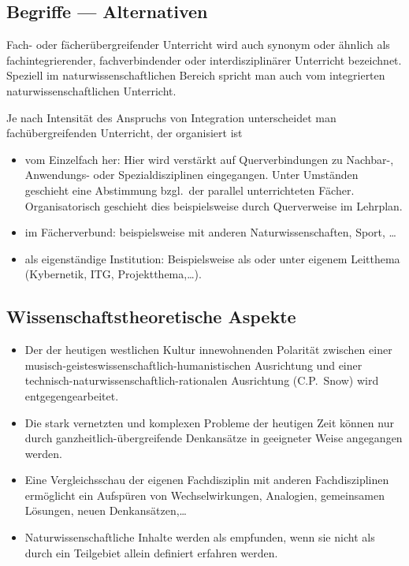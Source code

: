\subsection{Begriffe --- Alternativen}
Fach- oder f\"{a}cher\"{u}bergreifender Unterricht wird auch synonym
oder \"{a}hnlich als fachintegrierender, fachverbindender oder
interdisziplin\"{a}rer Unterricht bezeichnet.
Speziell im naturwissenschaftlichen Bereich spricht man auch vom
integrierten naturwissenschaftlichen Unterricht.

\mip
Je nach Intensit\"{a}t des Anspruchs von Integration unterscheidet man
fach\"{u}bergreifenden Unterricht, der organisiert ist
\begin{itemize}
\setlength{\itemsep}{0mm}
\item
vom Einzelfach her:
Hier wird verst\"{a}rkt auf Querverbindungen zu Nachbar-,
Anwendungs- oder Spezialdisziplinen eingegangen.
Unter Umst\"{a}nden geschieht eine Abstimmung
bzgl.\ der parallel unterrichteten F\"{a}cher.
Organisatorisch geschieht dies beispielsweise durch
Querverweise im Lehrplan.
\item
im F\"{a}cherverbund: beispielsweise mit anderen Naturwissenschaften, Sport, \dots
\item
als eigenst\"{a}ndige Institution:
Beispielsweise als  oder
unter eigenem Leitthema (Kybernetik, ITG, Projektthema,\dots).
\end{itemize}

\subsection{Wissenschaftstheoretische Aspekte}

\begin{itemize}
\setlength{\itemsep}{0mm}
\item
Der der heutigen westlichen Kultur innewohnenden Polarit\"{a}t
zwischen einer
musisch-geistes\-wis\-sen\-schaft\-lich-humanistischen
Ausrichtung und einer technisch-naturwissenschaftlich-rationalen
Ausrichtung (C.P.\ Snow) wird entgegengearbeitet.
\item
Die stark vernetzten und komplexen Probleme der heutigen Zeit
k\"{o}nnen nur durch ganz\-heit\-lich-\"{u}ber\-grei\-fen\-de
Denkans\"{a}tze in geeigneter Weise angegangen werden.
\item
Eine Vergleichsschau der eigenen Fachdisziplin
mit anderen Fachdisziplinen erm\"{o}glicht ein Aufsp\"{u}ren von
Wechselwirkungen, Analogien, gemeinsamen L\"{o}sungen, neuen
Denkans\"{a}tzen,\dots
\item
Naturwissenschaftliche Inhalte werden als  empfunden, wenn sie nicht als durch
ein Teilgebiet allein definiert erfahren werden.
\end{itemize}

